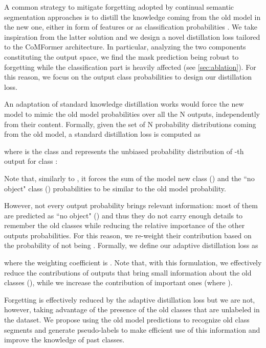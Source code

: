 \documentclass[10pt,twocolumn,letterpaper]{article}
\begin{document}
A common strategy to mitigate forgetting adopted by continual semantic segmentation approaches \cite{cermelli2020modelingthebackground, michieli2019ilt, douillard2020plop} is to distill the knowledge coming from the old model in the new one, either in form of features \cite{douillard2020plop, michieli2019ilt} or as classification probabilities \cite{cermelli2020modelingthebackground}.
We take inspiration from the latter solution and we design a novel distillation loss tailored to the CoMFormer architecture. In particular, analyzing the two components constituting the output space, we find the mask prediction being robust to forgetting while the classification part is heavily affected (see \cref{sec:ablation}). For this reason, we focus on the output class probabilities to design our distillation loss.

An adaptation of standard knowledge distillation works \cite{cermelli2020modelingthebackground} would force the new model to mimic the old model probabilities over all the N outputs, independently from their content. Formally, given the set of N probability distributions  coming from the old model, a standard distillation loss is computed as

where  is the  class and  represents the unbiased probability distribution of -th output for class :

Note that, similarly to \cite{cermelli2020modelingthebackground}, it forces the sum of the model new class () and the “no object" class () probabilities to be similar to the old model  probability.

However, not every output probability brings relevant information: most of them are predicted as “no object" () and thus they do not carry enough details to remember the old classes while reducing the relative importance of the other outputs probabilities. 
For this reason, we re-weight their contribution based on the probability of not being . Formally, we define our adaptive distillation loss as

where the weighting coefficient is . 
Note that, with this formulation, we effectively reduce the contributions of outputs that bring small information about the old classes (), while we increase the contribution of important ones (where ). 

Forgetting is effectively reduced by the adaptive distillation loss but we are not, however, taking advantage of the presence of the old classes that are unlabeled in the dataset. We propose using the old model predictions to recognize old class segments and generate pseudo-labels to make efficient use of this information and improve the knowledge of past classes.
\end{document}
